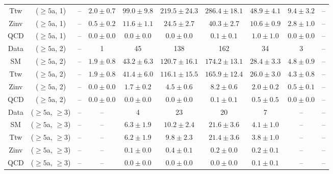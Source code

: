 \begin{table}[h!]
{\begin{tabular}{cccccccccc}
	Ttw & ($\ge5$a, 1) & -- & $2.0\pm 0.7$ & $99.0\pm 9.8$ & $219.5\pm 24.3$ & $286.4\pm 18.1$ & $48.9\pm 4.1$ & $9.4\pm 3.2$ & -- \\[0.5ex] 
	Zinv & ($\ge5$a, 1) & -- & $0.5\pm 0.2$ & $11.6\pm 1.1$ & $24.5\pm 2.7$ & $40.3\pm 2.7$ & $10.6\pm 0.9$ & $2.8\pm 1.0$ & -- \\[0.5ex] 
	QCD & ($\ge5$a, 1) & -- & $0.0\pm 0.0$ & $0.0\pm 0.0$ & $0.0\pm 0.0$ & $0.1\pm 0.1$ & $1.0\pm 1.0$ & $0.0\pm 0.0$ & -- \\[0.5ex] 
	Data & ($\ge5$a, 2) & -- & 1 & 45 & 138 & 162 & 34 & 3 & -- \\[0.5ex] 
	SM & ($\ge5$a, 2) & -- & $1.9\pm 0.8$ & $43.2\pm 6.3$ & $120.7\pm 16.1$ & $174.2\pm 13.1$ & $28.4\pm 3.3$ & $4.8\pm 0.9$ & -- \\[0.5ex] 
	Ttw & ($\ge5$a, 2) & -- & $1.9\pm 0.8$ & $41.4\pm 6.0$ & $116.1\pm 15.5$ & $165.9\pm 12.4$ & $26.0\pm 3.0$ & $4.3\pm 0.8$ & -- \\[0.5ex] 
	Zinv & ($\ge5$a, 2) & -- & $0.0\pm 0.0$ & $1.7\pm 0.2$ & $4.5\pm 0.6$ & $8.2\pm 0.6$ & $2.0\pm 0.2$ & $0.5\pm 0.1$ & -- \\[0.5ex] 
	QCD & ($\ge5$a, 2) & -- & $0.0\pm 0.0$ & $0.0\pm 0.0$ & $0.0\pm 0.0$ & $0.1\pm 0.1$ & $0.5\pm 0.5$ & $0.0\pm 0.0$ & -- \\[0.5ex] 
	Data & ($\ge5$a, $\ge3$) & -- & -- & 4 & 23 & 20 & 7 & -- & -- \\[0.5ex] 
	SM & ($\ge5$a, $\ge3$) & -- & -- & $6.3\pm 1.9$ & $10.2\pm 2.4$ & $21.6\pm 3.6$ & $4.1\pm 1.0$ & -- & -- \\[0.5ex] 
	Ttw & ($\ge5$a, $\ge3$) & -- & -- & $6.2\pm 1.9$ & $9.8\pm 2.3$ & $21.4\pm 3.6$ & $3.8\pm 1.0$ & -- & -- \\[0.5ex] 
	Zinv & ($\ge5$a, $\ge3$) & -- & -- & $0.1\pm 0.0$ & $0.4\pm 0.1$ & $0.2\pm 0.0$ & $0.2\pm 0.1$ & -- & -- \\[0.5ex] 
	QCD & ($\ge5$a, $\ge3$) & -- & -- & $0.0\pm 0.0$ & $0.0\pm 0.0$ & $0.0\pm 0.0$ & $0.1\pm 0.1$ & -- & -- \\[0.5ex] 
	\hline
	\hline
\end{tabular}}
\end{table}
